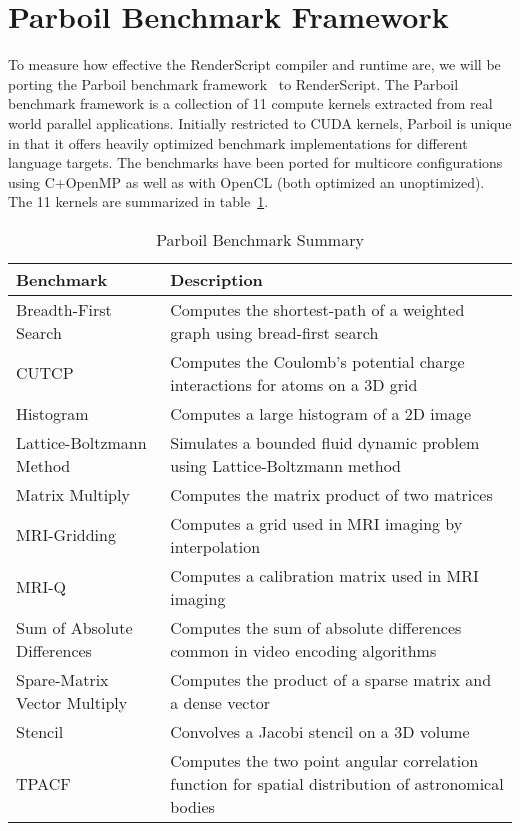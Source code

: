 
\section*{Parboil Benchmark Framework}

To measure how effective the RenderScript compiler and runtime
    are, we will be porting the Parboil benchmark framework~\cite{Parboil} to
    RenderScript.
The Parboil benchmark framework is a collection
  of 11 compute kernels extracted from
  real world parallel applications.
Initially restricted to CUDA kernels, Parboil is unique in that it offers
  heavily optimized benchmark implementations for different language targets.
The benchmarks have been ported for multicore configurations using C+OpenMP 
  as well as with OpenCL (both optimized an unoptimized).
The 11 kernels are summarized in table~\ref{table:parboil}.

\begin{table}[h]\footnotesize
\centering
\begin{tabular}{ | l | p{4cm} |}
    \hline 
    Benchmark & Description \\ \hline
    Breadth-First Search & Computes the shortest-path of a weighted graph using bread-first search \\
    CUTCP & Computes the Coulomb's potential charge interactions for atoms on a 3D grid \\
    Histogram & Computes a large histogram of a 2D image \\
    Lattice-Boltzmann Method & Simulates a bounded fluid dynamic problem using Lattice-Boltzmann method \\
    Matrix Multiply & Computes the matrix product of two matrices \\
    MRI-Gridding & Computes a grid used in MRI imaging by interpolation \\
    MRI-Q & Computes a calibration matrix used in MRI imaging \\
    Sum of Absolute Differences & Computes the sum of absolute differences common in video encoding algorithms \\
    Spare-Matrix Vector Multiply & Computes the product of a sparse matrix and a dense vector \\
    Stencil & Convolves a Jacobi stencil on a 3D volume \\
    TPACF & Computes the two point angular correlation function for spatial distribution of astronomical bodies \\   
    \hline
\end{tabular}
\caption{Parboil Benchmark Summary}
\label{table:parboil}
\end{table}


